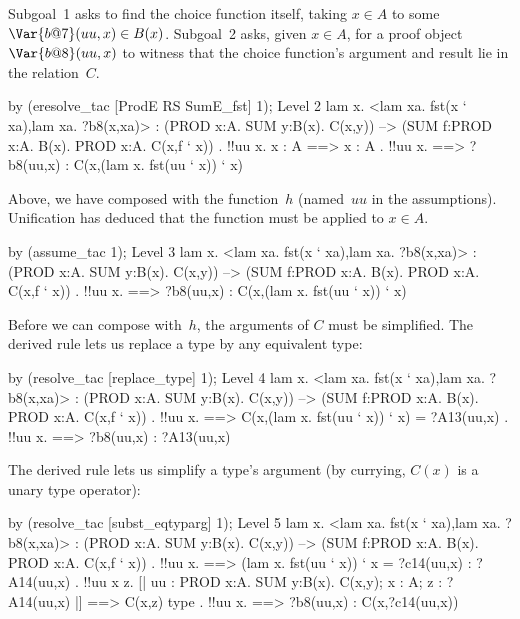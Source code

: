 Subgoal~1 asks to find the choice function itself, taking $x\in A$ to some
$\Var{b@7}(uu,x)\in B(x)$.  Subgoal~2 asks, given $x\in A$, for a proof
object $\Var{b@8}(uu,x)$ to witness that the choice function's argument
and result lie in the relation~$C$.  
\begin{ttbox}
by (eresolve_tac [ProdE RS SumE_fst] 1);
{\out Level 2}
{\out lam x. <lam xa. fst(x ` xa),lam xa. ?b8(x,xa)>}
{\out : (PROD x:A. SUM y:B(x). C(x,y)) -->}
{\out   (SUM f:PROD x:A. B(x). PROD x:A. C(x,f ` x))}
{. !!uu x. x : A ==> x : A}
{. !!uu x.}
{ ==>}
{\out        ?b8(uu,x) : C(x,(lam x. fst(uu ` x)) ` x)}
\end{ttbox}
Above, we have composed  with the function~$h$ (named~$uu$ in
the assumptions).  Unification has deduced that the function must be
applied to $x\in A$.
\begin{ttbox}
by (assume_tac 1);
{\out Level 3}
{\out lam x. <lam xa. fst(x ` xa),lam xa. ?b8(x,xa)>}
{\out : (PROD x:A. SUM y:B(x). C(x,y)) -->}
{\out   (SUM f:PROD x:A. B(x). PROD x:A. C(x,f ` x))}
{. !!uu x.}
{ ==>}
{\out        ?b8(uu,x) : C(x,(lam x. fst(uu ` x)) ` x)}
\end{ttbox}
Before we can compose  with~$h$, the arguments of $C$ must be
simplified.  The derived rule  lets us replace a type
by any equivalent type:
\begin{ttbox}
by (resolve_tac [replace_type] 1);
{\out Level 4}
{\out lam x. <lam xa. fst(x ` xa),lam xa. ?b8(x,xa)>}
{\out : (PROD x:A. SUM y:B(x). C(x,y)) -->}
{\out   (SUM f:PROD x:A. B(x). PROD x:A. C(x,f ` x))}
{. !!uu x.}
{ ==>}
{\out        C(x,(lam x. fst(uu ` x)) ` x) = ?A13(uu,x)}
{. !!uu x.}
{ ==>}
{\out        ?b8(uu,x) : ?A13(uu,x)}
\end{ttbox}
The derived rule  lets us simplify a type's
argument (by currying, $C(x)$ is a unary type operator):
\begin{ttbox}
by (resolve_tac [subst_eqtyparg] 1);
{\out Level 5}
{\out lam x. <lam xa. fst(x ` xa),lam xa. ?b8(x,xa)>}
{\out : (PROD x:A. SUM y:B(x). C(x,y)) -->}
{\out   (SUM f:PROD x:A. B(x). PROD x:A. C(x,f ` x))}
{. !!uu x.}
{ ==>}
{\out        (lam x. fst(uu ` x)) ` x = ?c14(uu,x) : ?A14(uu,x)}
{. !!uu x z.}
{\out        [| uu : PROD x:A. SUM y:B(x). C(x,y); x : A;}
{\out           z : ?A14(uu,x) |] ==>}
{\out        C(x,z) type}
{. !!uu x.}
{ ==>}
{\out        ?b8(uu,x) : C(x,?c14(uu,x))}
\end{ttbox}
